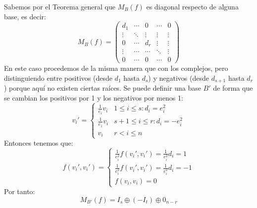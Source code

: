 \documentclass[10pt,a4paper,openright]{book}
\begin{document}
Sabemos por el Teorema general que $M_B(f)$ es diagonal respecto de alguna base, es decir:
$$M_B(f)=\begin{pmatrix} d_1 & \cdots & 0 & \cdots & 0 \\ \vdots & \ddots & \vdots & \vdots & \vdots \\ 0 & \cdots & d_r  & \vdots & \vdots \\ \vdots & \cdots & \cdots & \ddots & \vdots \\ 0 & \cdots & 0 & \cdots & 0\end{pmatrix}  $$
En este caso procedemos de la misma manera que con los complejos, pero distinguiendo entre positivos (desde $d_1$ hasta $d_s$) y negativos (desde $d_{s+1}$ hasta $d_r$) porque aquí no existen ciertas raíces. Se puede definir una base $B'$ de forma que se cambian los positivos por 1 y los negativos por menos 1:
$$v_i' =\begin{cases} \frac{1}{e_i}v_i & 1\leq i \leq s: d_i = e_i^2 \\ \frac{1}{e_1}v_i & s+1\leq i \leq r: d_i = -e_i^2 \\ v_i & r< i \leq n\end{cases} $$
Entonces tenemos que:
$$f(v_i', v_i') = \begin{cases} \frac{1}{e_i^2}f(v_i',v_i') = \frac{1}{e_i^2}d_i = 1 \\ \frac{1}{e_i^2}f(v_i',v_i') = \frac{1}{e_i^2}d_i = -1 \\ f(v_i,v_i) = 0\end{cases}$$
Por tanto:
$$M_{B'}(f) = I_s \oplus (-I_t)\oplus 0_{n-r}$$
\end{document}
